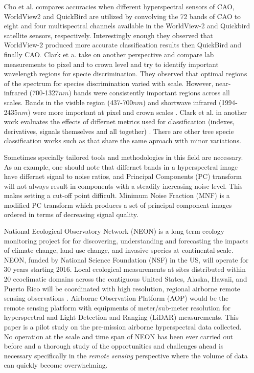 \documentclass[remotesensing,article,accept,moreauthors,pdftex,12pt,a4paper]{mdpi}
\begin{document}
Cho et al. \cite{cho2012mapping} compares accuracies when different hyperspectral sensors of CAO, WorldView2 and QuickBird are utilized by convolving the 72 bands of CAO to eight and four multispectral channels available in the WorldView-2 and Quickbird satellite sensors, respectively. Interestingly enough they observed that WorldView-2 produced more accurate classification results then QuickBird and finally CAO. Clark et a. take on another perspective and compare lab measurements to pixel and to crown level \cite{clark2005hyperspectral} and try to identify important wavelength regions for specie discrimination. They observed that optimal regions of the spectrum for species discrimination varied with scale. However, near-infrared (700-1327$nm$) bands were consistently important regions across all scales. Bands in the visible region (437-700$nm$) and shortwave infrared (1994-2435$nm$) were more important at pixel and crown scales  \cite{clark2005hyperspectral}. Clark et al.  in another work evaluates the effects of differnet metrics used for classification (indexes, derivatives, signals themselves and all together) \cite{clark2012species}. There are other tree specie classification works such as \cite{dalponte2014tree, feret2012semi, feret2013tree, ghosh2014framework, immitzer2012tree, naidoo2012classification, ustin2009retrieval} that share the same aproach with minor variations. 

Sometimes specially tailored tools and methodologies in this field are necessary. As an example, one should note that differnet bands in a hyperspectral image have differnet signal to noise ratios, and Principal Components (PC) transform will not always result in components with a steadily increasing noise level. This makes setting a cut-off point difficult. Minimum Noise Fraction (MNF)   \cite{green1988transformation} is a modified PC transform which produces a set of principal component images ordered in terms of decreasing signal quality. 


National Ecological Observatory Network (NEON) is a long term ecology monitoring project for for discovering, understanding and forecasting the impacts of climate change, land use change, and invasive species at continental-scale. NEON, funded by National Science Foundation (NSF) in the US, will operate for 30 years starting 2016. Local ecological measurements at sites distributed within 20 ecoclimatic domains across the contiguous United States, Alaska, Hawaii, and Puerto Rico will be coordinated with high resolution, regional airborne remote sensing observations \cite{kampe2010neon}. Airborne Observation Platform (AOP) would be the remote sensing platform with equipments of meter/sub-meter resolution for hyperspectral and Light Detection and Ranging (LiDAR) measurements. This paper is a pilot study on the pre-mission airborne hyperspectral data collected. No operation at the scale and time span of NEON has been ever carried out before and a thorough study of the opportunities and challenges ahead is necessary specifically in the \textit{remote sensing} perspective where the volume of data can quickly become overwhelming.
\end{document}
